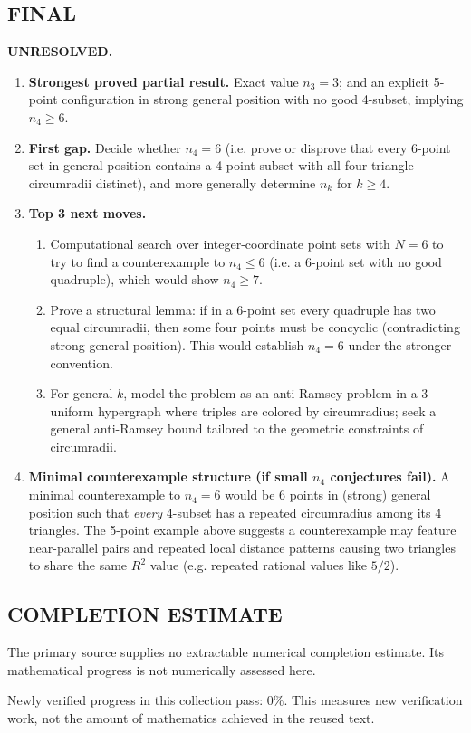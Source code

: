 \subsection*{FINAL}
\textbf{UNRESOLVED.}
\begin{enumerate}
\item[(i)] \textbf{Strongest proved partial result.} Exact value $n_3=3$; and an explicit 5-point configuration in strong general position with no good 4-subset, implying $n_4\ge 6$.
\item[(ii)] \textbf{First gap.} Decide whether $n_4=6$ (i.e. prove or disprove that every 6-point set in general position contains a 4-point subset with all four triangle circumradii distinct), and more generally determine $n_k$ for $k\ge 4$.
\item[(iii)] \textbf{Top 3 next moves.}
  \begin{enumerate}
  \item Computational search over integer-coordinate point sets with $N=6$ to try to find a counterexample to $n_4\le 6$ (i.e. a 6-point set with no good quadruple), which would show $n_4\ge 7$.
  \item Prove a structural lemma: if in a 6-point set every quadruple has two equal circumradii, then some four points must be concyclic (contradicting strong general position). This would establish $n_4=6$ under the stronger convention.
  \item For general $k$, model the problem as an anti-Ramsey problem in a 3-uniform hypergraph where triples are colored by circumradius; seek a general anti-Ramsey bound tailored to the geometric constraints of circumradii.
  \end{enumerate}
\item[(iv)] \textbf{Minimal counterexample structure (if small $n_4$ conjectures fail).} A minimal counterexample to $n_4=6$ would be 6 points in (strong) general position such that \emph{every} 4-subset has a repeated circumradius among its 4 triangles. The 5-point example above suggests a counterexample may feature near-parallel pairs and repeated local distance patterns causing two triangles to share the same $R^2$ value (e.g. repeated rational values like $5/2$).
\end{enumerate}



\subsection*{COMPLETION ESTIMATE}
The primary source supplies no extractable numerical completion estimate. Its mathematical progress is not numerically assessed here.

Newly verified progress in this collection pass: $0\%$. This measures new verification work, not the amount of mathematics achieved in the reused text.
